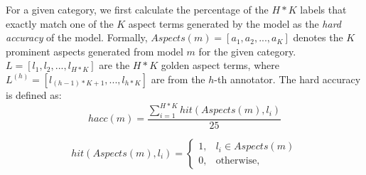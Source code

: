 For a given category, we first calculate the percentage of the $H*K$ labels that exactly match one of the $K$ aspect terms generated by the model as the \textit{hard accuracy} 
of the model. 
Formally, $Aspects(m) = [a_1, a_2, ..., a_K]$ denotes 
the $K$ prominent aspects generated from model $m$ for 
the given category.
$L = [l_1, l_2, ..., l_{H*K}]$ are the $H*K$ golden aspect terms,
where $L^{(h)}= [l_{(h-1)*K+1}, ..., l_{h*K}]$ are from the $h$-th annotator.
The hard accuracy is defined as:
\begin{equation}
hacc(m) = \frac{\sum_{i=1}^{H*K}{hit(Aspects(m), l_i)}}{25}
\end{equation}

\begin{equation}
hit(Aspects(m), l_i) = 
\begin{cases}
1, & l_i \in Aspects(m) \\
0, & \text{otherwise, }
\end{cases}
\end{equation}



